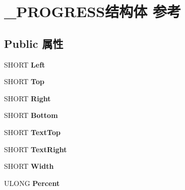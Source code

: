 \hypertarget{struct___p_r_o_g_r_e_s_s}{}\section{\+\_\+\+P\+R\+O\+G\+R\+E\+S\+S结构体 参考}
\label{struct___p_r_o_g_r_e_s_s}
\subsection*{Public 属性}
\begin{DoxyCompactItemize}
\item 
\mbox{\label{struct___p_r_o_g_r_e_s_s_acb6736e16f84400bc91e675a4a146908}} 
S\+H\+O\+RT {\bfseries Left}
\item 
\mbox{\label{struct___p_r_o_g_r_e_s_s_a630307e40d1cec796c9d0a369ebd4e5c}} 
S\+H\+O\+RT {\bfseries Top}
\item 
\mbox{\label{struct___p_r_o_g_r_e_s_s_ac6c2d3a7dfc1eeb3c271ebd0242c3b80}} 
S\+H\+O\+RT {\bfseries Right}
\item 
\mbox{\label{struct___p_r_o_g_r_e_s_s_a3deaa858547916c26feaf61ae21cf5c9}} 
S\+H\+O\+RT {\bfseries Bottom}
\item 
\mbox{\label{struct___p_r_o_g_r_e_s_s_ae63e069760c23ef216fd1e6d9e4df1dd}} 
S\+H\+O\+RT {\bfseries Text\+Top}
\item 
\mbox{\label{struct___p_r_o_g_r_e_s_s_af55629949b0fe4be902a17a8ced69db4}} 
S\+H\+O\+RT {\bfseries Text\+Right}
\item 
\mbox{\label{struct___p_r_o_g_r_e_s_s_a53e3fd74e072d7c13456f7b8086126cc}} 
S\+H\+O\+RT {\bfseries Width}
\item 
\mbox{\label{struct___p_r_o_g_r_e_s_s_ac1248b2c4c15af2836f8ac26790fc366}} 
U\+L\+O\+NG {\bfseries Percent}
\item 
\mbox{\label{struct___p_r_o_g_r_e_s_s_ab8b34d798973a7a6077ae305fb5e3758}} 

\end{DoxyCompactItemize}
